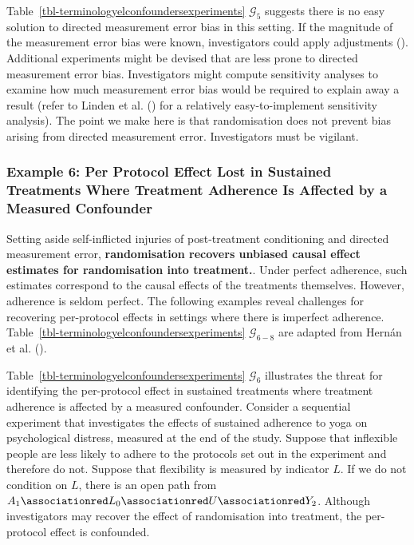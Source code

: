 \documentclass[
  single column]{article}
\begin{document}
Table~\ref{tbl-terminologyelconfoundersexperiments} \(\mathcal{G}_{5}\)
suggests there is no easy solution to directed measurement error bias in
this setting. If the magnitude of the measurement error bias were known,
investigators could apply adjustments
(). Additional
experiments might be devised that are less prone to directed measurement
error bias. Investigators might compute sensitivity analyses to examine
how much measurement error bias would be required to explain away a
result (refer to Linden et al. ()
for a relatively easy-to-implement sensitivity analysis). The point we
make here is that randomisation does not prevent bias arising from
directed measurement error. Investigators must be vigilant.

\subsubsection{Example 6: Per Protocol Effect Lost in Sustained
Treatments Where Treatment Adherence Is Affected by a Measured
Confounder}\label{example-6-per-protocol-effect-lost-in-sustained-treatments-where-treatment-adherence-is-affected-by-a-measured-confounder}

Setting aside self-inflicted injuries of post-treatment conditioning and
directed measurement error, \textbf{randomisation recovers unbiased
causal effect estimates for randomisation into treatment.}. Under
perfect adherence, such estimates correspond to the causal effects of
the treatments themselves. However, adherence is seldom perfect. The
following examples reveal challenges for recovering per-protocol effects
in settings where there is imperfect adherence.
Table~\ref{tbl-terminologyelconfoundersexperiments}
\(\mathcal{G}_{6-8}\) are adapted from Hernán et al.
().

Table~\ref{tbl-terminologyelconfoundersexperiments} \(\mathcal{G}_{6}\)
illustrates the threat for identifying the per-protocol effect in
sustained treatments where treatment adherence is affected by a measured
confounder. Consider a sequential experiment that investigates the
effects of sustained adherence to yoga on psychological distress,
measured at the end of the study. Suppose that inflexible people are
less likely to adhere to the protocols set out in the experiment and
therefore do not. Suppose that flexibility is measured by indicator
\(L\). If we do not condition on \(L\), there is an open path from
\(A_1 \associationred L_0 \associationred U \associationred Y_2\).
Although investigators may recover the effect of randomisation into
treatment, the per-protocol effect is confounded.
\end{document}
